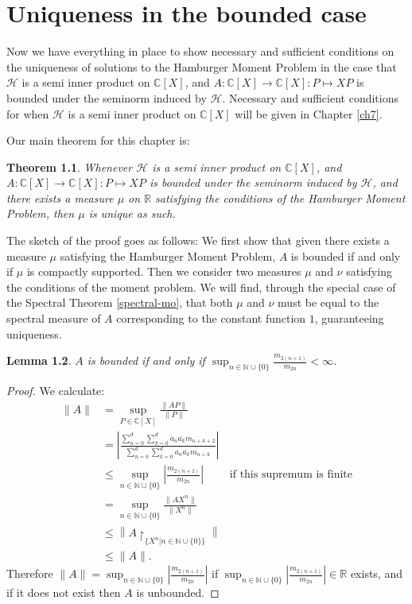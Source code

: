 \documentclass[12pt,oneside]{report}
\newtheorem{thm}{Theorem}[chapter]
\newtheorem{lem}[thm]{Lemma}
\begin{document}
\chapter{Uniqueness in the bounded case}\label{ch4}

Now we have everything in place to show necessary and sufficient conditions on the uniqueness of solutions to the Hamburger Moment Problem in the case that $\mathcal{H}$ is a semi inner product on $\mathbb{C}[X]$, and $A: \mathbb{C}[X] \to \mathbb{C}[X]: P \mapsto XP$ is bounded under the seminorm induced by $\mathcal{H}$. Necessary and sufficient conditions for when $\mathcal{H}$ is a semi inner product on $\mathbb{C}[X]$ will be given in Chapter \ref{ch7}.
 
Our main theorem for this chapter is:

\begin{thm}\label{uniqueness}
    Whenever $\mathcal{H}$ is a semi inner product on $\mathbb{C}[X]$, and $A: \mathbb{C}[X] \to \mathbb{C}[X]: P \mapsto XP$ is bounded under the seminorm induced by $\mathcal{H}$, and there exists a measure $\mu$ on $\mathbb{R}$ satisfying the conditions of the Hamburger Moment Problem, then $\mu$ is unique as such.
\end{thm}

The sketch of the proof goes as follows: We first show that given there exists a measure $\mu$ satisfying the Hamburger Moment Problem, $A$ is bounded if and only if $\mu$ is compactly supported. Then we consider two measures $\mu$ and $\nu$ satisfying the conditions of the moment problem. We will find, through the special case of the Spectral Theorem \ref{spectral-mo}, that both $\mu$ and $\nu$ must be equal to the spectral measure of $A$ corresponding to the constant function $1$, guaranteeing uniqueness.

\begin{lem}\label{A-bound}
    $A$ is bounded if and only if $\sup_{n \in \mathbb{N} \cup \{ 0 \}}\frac{m_{2(n+1)}}{m_{2n}} < \infty$.
\end{lem}
\begin{proof}
    We calculate:
    \begin{align*}
        \|A\| &= \sup_{P \in \mathbb{C}[X]} \frac{\|AP\|}{\|P\|} \\
        &= \left|\frac{\sum_{n=0}^{d}\sum_{k=0}^{d}a_{n}\overline{a_{k}}m_{n+k+2}}{\sum_{n=0}^{d}\sum_{k=0}^{d}a_{n}\overline{a_{k}}m_{n+k}}\right| \\
        &\leq \sup_{n \in \mathbb{N} \cup \{ 0 \}} \left|\frac{m_{2(n+1)}}{m_{2n}}\right| & \text{if this supremum is finite} \\
        &= \sup_{n \in \mathbb{N} \cup \{ 0 \}} \frac{\|AX^{n}\|}{\|X^{n}\|} \\
        &\leq \left\|A\restriction_{\{ X^{n} | n \in \mathbb{N} \cup \{ 0 \} \}}\right\| \\
        &\leq \|A\|.
    \end{align*}
    Therefore $\|A\| = \sup_{n \in \mathbb{N} \cup \{ 0 \}} \left|\frac{m_{2(n+1)}}{m_{2n}}\right|$ if $\sup_{n \in \mathbb{N} \cup \{ 0 \}} \left|\frac{m_{2(n+1)}}{m_{2n}}\right| \in \mathbb{R}$ exists, and if it does not exist then $A$ is unbounded.
\end{proof}
\end{document}
